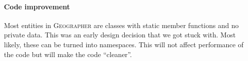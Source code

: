 \documentclass[a4paper,10pt]{article}
\newcommand{\geo}{\textsc{Geographer} }
\newcommand{\quot}[1]{``#1''}
\begin{document}
\paragraph*{Code improvement}
Most entities in \geo are classes with static member functions and no private data. This was
an early design decision that we got stuck with. Most likely, these can be turned into namespaces.
This will not affect performance of the code but will make the code \quot{cleaner}.
\end{document}
